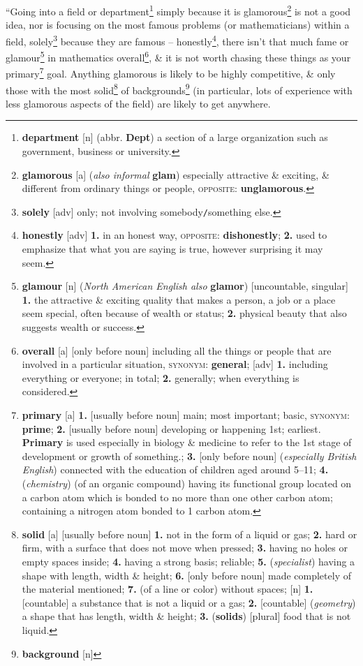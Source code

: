 \documentclass{article}
\numberwithin{equation}{section}
\begin{document}
``Going into a field or department\footnote{\textbf{department} [n] (abbr. \textbf{Dept}) a section of a large organization such as government, business or university.} simply because it is glamorous\footnote{\textbf{glamorous} [a] (\textit{also informal} \textbf{glam}) especially attractive \& exciting, \& different from ordinary things or people, \textsc{opposite}: \textbf{unglamorous}.} is not a good idea, nor is focusing on the most famous problems (or mathematicians) within a field, solely\footnote{\textbf{solely} [adv] only; not involving somebody\texttt{/}something else.} because they are famous -- honestly\footnote{\textbf{honestly} [adv] \textbf{1.} in an honest way, \textsc{opposite}: \textbf{dishonestly}; \textbf{2.} used to emphasize that what you are saying is true, however surprising it may seem.}, there isn't that much fame or glamour\footnote{\textbf{glamour} [n] (\textit{North American English also} \textbf{glamor}) [uncountable, singular] \textbf{1.} the attractive \& exciting quality that makes a person, a job or a place seem special, often because of wealth or status; \textbf{2.} physical beauty that also suggests wealth or success.} in mathematics overall\footnote{\textbf{overall} [a] [only before noun] including all the things or people that are involved in a particular situation, \textsc{synonym}: \textbf{general}; [adv] \textbf{1.} including everything or everyone; in total; \textbf{2.} generally; when everything is considered.}, \& it is not worth chasing these things as your primary\footnote{\textbf{primary} [a] \textbf{1.} [usually before noun] main; most important; basic, \textsc{synonym}: \textbf{prime}; \textbf{2.} [usually before noun] developing or happening 1st; earliest. \textbf{Primary} is used especially in biology \& medicine to refer to the 1st stage of development or growth of something.; \textbf{3.} [only before noun] (\textit{especially British English}) connected with the education of children aged around 5--11; \textbf{4.} (\textit{chemistry}) (of an organic compound) having its functional group located on a carbon atom which is bonded to no more than one other carbon atom; containing a nitrogen atom bonded to 1 carbon atom.} goal. Anything glamorous is likely to be highly competitive, \& only those with the most solid\footnote{\textbf{solid} [a] [usually before noun] \textbf{1.} not in the form of a liquid or gas; \textbf{2.} hard or firm, with a surface that does not move when pressed; \textbf{3.} having no holes or empty spaces inside; \textbf{4.} having a strong basis; reliable; \textbf{5.} (\textit{specialist}) having a shape with length, width \& height; \textbf{6.} [only before noun] made completely of the material mentioned; \textbf{7.} (of a line or color) without spaces; [n] \textbf{1.} [countable] a substance that is not a liquid or a gas; \textbf{2.} [countable] (\textit{geometry}) a shape that has length, width \& height; \textbf{3.} (\textbf{solids}) [plural] food that is not liquid.} of backgrounds\footnote{\textbf{background} [n] } (in particular, lots of experience with less glamorous aspects of the field) are likely to get anywhere.
\end{document}
